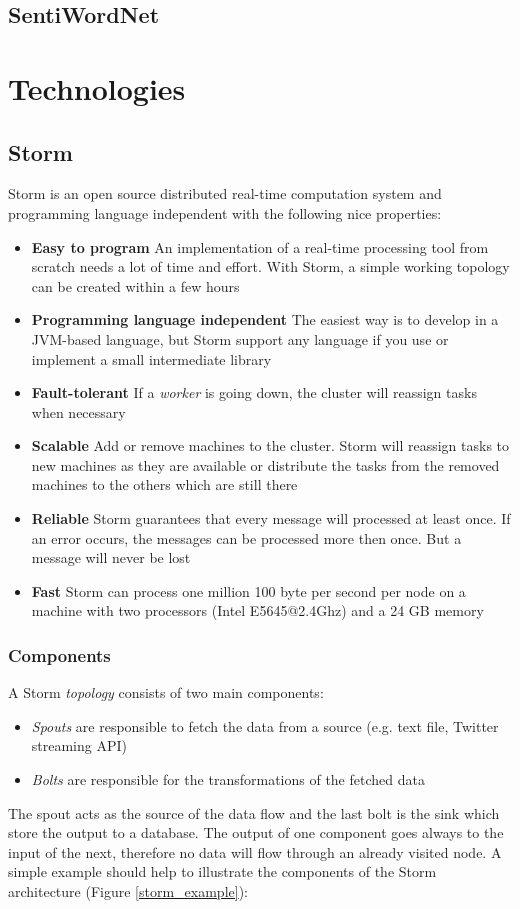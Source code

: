 \documentclass[a4paper]{article}
\begin{document}
\subsection{SentiWordNet}\label{sentiWordNet}

\section{Technologies}

\subsection{Storm}
Storm is an open source distributed real-time computation system and programming language independent with the following nice properties:
\begin{itemize}
	\item \textbf{Easy to program} An implementation of a real-time processing tool from scratch needs a lot of time and effort. With Storm, a simple working topology can be created within a few hours 
	\item \textbf{Programming language independent} The easiest way is to develop in a JVM-based language, but Storm support any language if you use or implement a small intermediate library 
	\item \textbf{Fault-tolerant} If a \textit{worker} is going down, the cluster will reassign tasks when necessary 
	\item \textbf{Scalable} Add or remove machines to the cluster. Storm will reassign tasks to new machines as they are available or distribute the tasks from the removed machines to the others which are still there 
	\item \textbf{Reliable} Storm guarantees that every message will processed at least once. If an error occurs, the messages can be processed more then once. But a message will never be lost 
	\item \textbf{Fast} Storm can process one million 100 byte per second per node on a machine with two processors (Intel E5645@2.4Ghz) and a 24 GB memory 
\end{itemize}
\subsubsection{Components}\label{storm_components}
A Storm \textit{topology} consists of two main components:
\begin{itemize}
	\item \textit{Spouts} are responsible to fetch the data from a source (e.g. text file, Twitter streaming API)
	\item \textit{Bolts} are responsible for the transformations of the fetched data
\end{itemize}
The spout acts as the source of the data flow and the last bolt is the sink which store the output to a database. The output of one component goes always to the input of the next, therefore no data will flow through an already visited node. A simple example should help to illustrate the components of the Storm architecture (Figure \ref{storm_example}):\\
\end{document}
